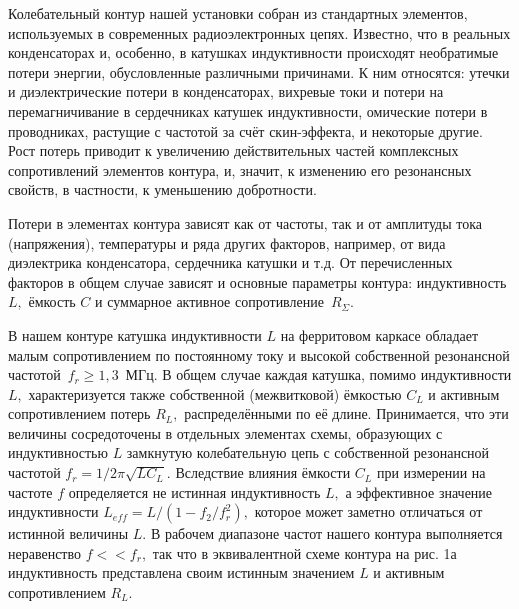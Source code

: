 Колебательный контур нашей установки собран из стандартных элементов, используе\-мых в современных радиоэлектронных цепях. Известно, что в реальных конденсаторах и, особенно, в катушках индуктивности происходят необратимые потери энергии, обусловлен\-ные различными причинами. К ним относятся: утечки и диэлектрические потери в конденсаторах, вихревые токи и потери на перемагничивание в сердечниках катушек индуктивности, омические потери в проводниках, растущие с частотой за счёт скин-эффекта, и некоторые другие. Рост потерь приводит к увеличению действительных частей комплексных сопротивлений элементов контура, и, значит, к изменению его резонансных свойств, в частности, к уменьшению добротности.

Потери в элементах контура зависят как от частоты, так и от амплитуды тока (напряже\-ния), температуры и ряда других факторов, например, от вида диэлектрика конденсатора, сердечника катушки и т.д. От перечисленных факторов в общем случае зависят и основные параметры контура: индуктивность $L,$ ёмкость $C$ и суммарное активное сопротивление~$R_{\Sigma}.$

В нашем контуре катушка индуктивности $L$ на ферритовом каркасе обладает малым со\-противлением по постоянному току и высокой собственной резонансной частотой~$f_r\ge1,3$~МГц. В общем случае каждая катушка, помимо индуктивности $L,$ характеризуется также собственной (межвитковой) ёмкостью $C_L$ и активным сопротивлением потерь $R_L,$ распределёнными по её длине. Принимается, что эти величины сосредоточены в отдельных элементах схемы, образующих с индуктивностью $L$ замкнутую колебательную цепь с собст\-венной резонансной частотой  $f_r=1/2\pi\sqrt{LC_L}.$ Вследствие влияния ёмкости $C_L$ при измере\-нии на частоте $f$ определяется не истинная индуктивность $L,$ а эффективное значение индуктивности $L_{eff}=L/(1-f_2/f_r^2),$ которое может заметно отличаться от истинной величины $L.$ В рабочем диапазоне частот нашего контура выполняется неравенство $f<<f_r,$ так что в эквивалентной схеме контура на рис. 1а индуктивность представлена своим истинным значением $L$ и активным сопротивлением $R_L.$


